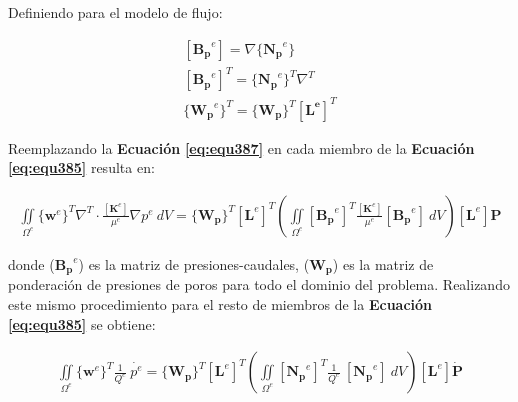 Definiendo para el modelo de flujo:
\begin{ceqn} 
\begin{subequations} \label{eq:equ387} 
\begin{gather}
[\mathbf{B_p}^e] = \nabla \{\mathbf{N_p}^e\} \label{eq:equ387a}\\[10pt]
[\mathbf{B_p}^e]^T = \{\mathbf{N_p}^e\}^T \nabla^T  \label{eq:equ387b}\\[10pt]
\{\mathbf{W_p}^e\}^T = \{\mathbf{W_p}\}^T \left[\mathbf{L^e}\right]^T  \label{eq:equ387c}
\end{gather}  
\end{subequations} 
\end{ceqn}

Reemplazando la \textbf{Ecuación} \textbf{\ref{eq:equ387}} en cada miembro de la \textbf{Ecuación} \textbf{\ref{eq:equ385}} resulta en:

\begin{ceqn} %
\begin{gather}\label{eq:equ388}
\iint \limits_{\Omega^e} \{\mathbf{w}^e\}^T \nabla^T \cdot \frac{[\mathbf{K}^e]}{\mu^e} \nabla p^e\ dV = 
\{\mathbf{W_p}\}^T \left[\mathbf{L}^e\right]^T \left( \iint \limits_{\Omega^e}  [\mathbf{B_p}^e]^T \frac{[\mathbf{K}^e]}{\mu^e} [\mathbf{B_p}^e]\ dV \right) \left[\mathbf{L}^e\right] \mathbf{P}
\end{gather}   
\end{ceqn}

donde ($\mathbf{B_p}^e$) es la matriz de presiones-caudales, ($\mathbf{W_p}$) es la matriz de ponderación de presiones de poros para todo el dominio del problema. Realizando este mismo procedimiento para el resto de miembros de la  \textbf{Ecuación} \textbf{\ref{eq:equ385}} se obtiene:
\begin{ceqn} %
\begin{gather}\label{eq:equ389}
\iint \limits_{\Omega^e} \{\mathbf{w}^e\}^T \frac{1}{Q^e}\ \dot{p^e} = 
\{\mathbf{W_p}\}^T \left[\mathbf{L}^e\right]^T \left( \iint \limits_{\Omega^e}  [\mathbf{N_p}^e]^T \frac{1}{Q^e}\ [\mathbf{N_p}^e]\ dV \right) \left[\mathbf{L}^e\right] \mathbf{\dot{P}}
\end{gather}   
\end{ceqn}

